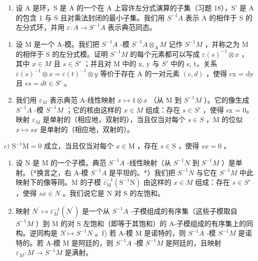 \begin{enumerate}
\def\labelenumi{\arabic{enumi})}
\setcounter{enumi}{18}
\tightlist
\item
  设 A 是环，S 是 A 的一个在 A 上容许左分式演算的子集（习题 18），S' 是 A 的包含 1 与 S 且对乘法封闭的最小子集。我们用 \(S^{-1}A\) 表示 A 的相伴于 S 的左分式环，并用 \(\varepsilon:A\to S^{-1}A\) 表示典范同态。
\end{enumerate}

\begin{enumerate}
\def\labelenumi{\alph{enumi})}
\item
  设 M 是一个 A-模。我们把 \(S^{-1}A\) -模 \(S^{-1}A \otimes_{A} M\) 记作 \(S^{-1}M\) ，并称之为 M 的相伴于 S 的左分式模。证明 \(S^{-1}M\) 的每个元素都可以写成 \(\varepsilon(s)^{-1} \otimes x\) ，其中 \(x \in M\) 且 \(s \in S'\) ；并且对 M 中的 x, y 与 \(S'\) 中的 s, t，关系 \(\varepsilon(s)^{-1} \otimes x = \varepsilon(t)^{-1} \otimes y\) 等价于存在 A 的一对元素 \((c, d)\) ，使得 cx = dy 且 \(cs = dt \in S'\) 。
\item
  我们用 \(\varepsilon_{M}\) 表示典范 A-线性映射 \(x \mapsto 1 \otimes x\) （从 M 到 \(S^{-1}M\) ）。它的像生成 \(S^{-1}A\) -模 \(S^{-1}M\) ；它的核由这样的 \(x \in M\) 组成：存在 \(s \in S'\) ，使得 sx = 0。映射 \(\varepsilon_{M}\) 是单射的（相应地，双射的），当且仅当对每个 \(s \in S\) ，M 的位似 \(x \mapsto sx\) 是单射的（相应地，双射的）。
\end{enumerate}

\(c)\) \(\mathrm{S}^{-1}\mathrm{M} = 0\) 成立，当且仅当对每个 \(x\in \mathrm{M}\) ，存在 \(s\in \mathrm{S}\) ，使得 \(sx = 0\) 。

\begin{enumerate}
\def\labelenumi{\alph{enumi})}
\setcounter{enumi}{3}
\item
  设 N 是 M 的一个子模。典范 \(S^{-1}A\) -线性映射（从 \(S^{-1}N\) 到 \(S^{-1}M\) ）是单射。（*换言之，右 A-模 \(S^{-1}A\) 是平坦的。*）我们把 \(S^{-1}N\) 与它在 \(S^{-1}M\) 中此映射下的像等同。M 的子模 \(\bar{\varepsilon}_{\mathrm{M}}^{-1}(\mathrm{S}^{-1}\mathrm{N})\) 由这样的 \(x \in M\) 组成：存在 \(s \in S'\) ，使得 \(sx \in N\) 。我们说它是 N 对 S 的左饱和。
\item
  映射 \(N^{\prime} \mapsto \varepsilon_{M}^{-1}(N^{\prime})\) 是一个从 \(S^{-1}A\) -子模组成的有序集（这些子模取自 \(S^{-1}M\) ）到 M 的对 S 左饱和（即等于其饱和）的 A-子模组成的有序集上的同构。逆同构是 \(N \mapsto S^{-1}N\) 。f) 若 A-模 M 是诺特的，则 \(S^{-1}A\) -模 \(S^{-1}M\) 是诺特的。若 A-模 M 是阿廷的，则 \(S^{-1}A\) -模 \(S^{-1}M\) 是阿廷的，且映射 \(\varepsilon_{M}: M \to S^{-1}M\) 是满射。
\end{enumerate}

